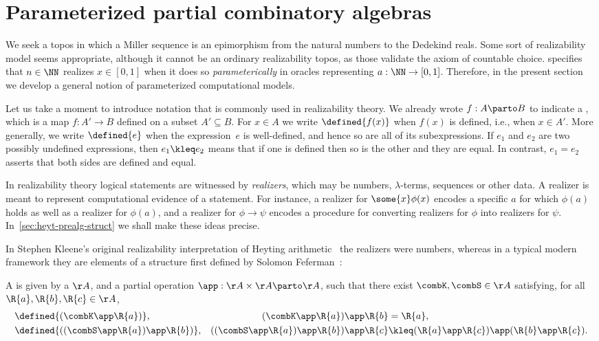 \section{Parameterized partial combinatory algebras}
\label{sec:parameterized-part-comb}

We seek a topos in which a Miller sequence is an epimorphism from the natural numbers to the Dedekind reals. Some sort of realizability model seems appropriate, although it cannot be an ordinary realizability topos, as those validate the axiom of countable choice.
%
 specifies that $n \in \NN$ realizes $x \in [0,1]$ when it does so \emph{parameterically} in oracles representing $a : \NN \to [0,1]$. Therefore, in the present section we develop a general notion of parameterized computational models.

Let us take a moment to introduce notation that is commonly used in realizability theory. We already wrote $f : A \parto B$ to indicate a , which is a map $f : A' \to B$ defined on a subset $A' \subseteq B$. For $x \in A$ we write $\defined{f(x)}$ when $f(x)$ is defined, i.e., when $x \in A'$. More generally, we write $\defined{e}$ when the expression~$e$ is well-defined, and hence so are all of its subexpressions. If $e_1$ and $e_2$ are two possibly undefined expressions, then $e_1 \kleq e_2$ means that if one is defined then so is the other and they are equal. In contrast, $e_1 = e_2$ asserts that both sides are defined and equal.

In realizability theory logical statements are witnessed by \emph{realizers}, which may be numbers, $\lambda$-terms, sequences or other data. A realizer is meant to represent computational evidence of a statement.
For instance, a realizer for $\some{x} \phi(x)$ encodes a specific $a$ for which $\phi(a)$ holds as well as a realizer for $\phi(a)$, and a realizer for $\phi \to \psi$ encodes a procedure for converting realizers for $\phi$ into realizers for $\psi$. In~\cref{sec:heyt-prealg-struct} we shall make these ideas precise.

In Stephen Kleene's original realizability interpretation of Heyting arithmetic~\cite{KleeneSC:intint} the realizers were numbers, whereas in a typical modern framework they are elements of a structure first defined by Solomon Feferman~\cite{feferman75}:

\begin{definition}
  \label{def:pca}%
  A  is given by a  $\AA$, and a partial  operation ${\app} : \AA \times \AA \parto \AA$, such that there exist  $\combK, \combS \in \AA$ satisfying, for all $\R{a}, \R{b}, \R{c} \in \AA$,
  \begin{align*}
    &\defined{(\combK \app \R{a})}, &
    (\combK \app \R{a}) \app \R{b} &= \R{a}, \\
    &\defined{((\combS \app \R{a}) \app \R{b})}, &
    ((\combS \app \R{a}) \app \R{b}) \app \R{c} &\kleq (\R{a} \app \R{c}) \app (\R{b} \app \R{c}).
  \end{align*}
\end{definition}

